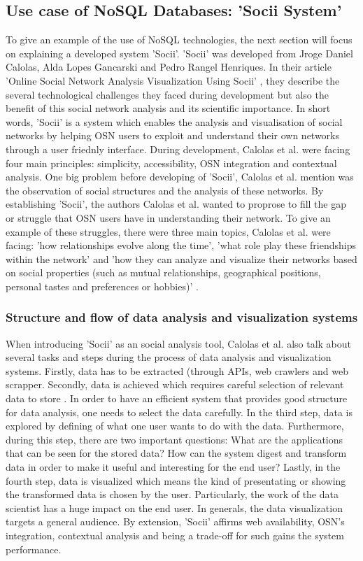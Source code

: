 \subsection{Use case of NoSQL Databases: 'Socii System'}

To give an example of the use of NoSQL technologies, the next section will focus on explaining a developed system 'Socii'. 'Socii' was developed from Jroge Daniel Calolas, Alda Lopes Gancarski and Pedro Rangel Henriques. In their article 'Online Social Network Analysis Visualization Using Socii' \cite[p.218-228]{trends_nosql}, they describe the several technological challenges they faced during development but also the benefit of this social network analysis and its scientific importance. In short words, 'Socii' is a system which enables the analysis and visualisation of social networks by helping \ac{OSN} users to exploit and understand their own networks through a user friednly interface. During development, Calolas et al. were facing four main principles: simplicity, accessibility, OSN integration and contextual analysis.
One big problem before developing of 'Socii', Calolas et al. mention was the observation of social structures and the analysis of these networks. By establishing 'Socii', the authors Calolas et al. wanted to proprose to fill the gap or struggle that OSN users have in understanding their network. To give an example of these struggles, there were three main topics, Calolas et al. were facing: 'how relationships evolve along the time', 'what role play these friendships within the network' and 'how they can analyze and visualize their networks based on social properties (such as mutual relationships, geographical positions, personal tastes and preferences or hobbies)' \cite{trends_nosql}. 

\subsubsection{Structure and flow of data analysis and visualization systems}

When introducing 'Socii' as an social analysis tool, Calolas et al. also talk about several tasks and steps during the process of data analysis and visualization systems. Firstly, data has to be extracted (through APIs, web crawlers and web scrapper. Secondly, data is achieved which requires careful selection of relevant data to store \cite{trends_nosql}. In order to have an efficient system that provides good structure for data analysis, one needs to select the data carefully. In the third step, data is explored by defining of what one user wants to do with the data. Furthermore, during this step, there are two important questions: What are the applications that can be seen for the stored data? How can the system digest and transform data in order to make it useful and interesting for the end user? 
Lastly, in the fourth step, data is visualized which means the kind of presentating or showing the transformed data is chosen by the user. Particularly, the work of the data scientist has a huge impact on the end user. In generals, the data visualization targets a general audience.  
By extension, 'Socii' affirms web availability, OSN's  integration, contextual analysis and being a trade-off for such gains the system performance.

